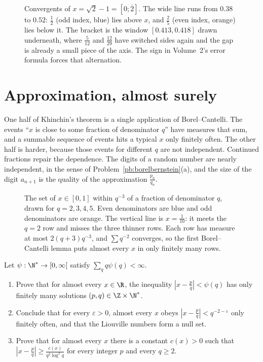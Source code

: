 \begin{figure}[ht]
\centering
{}
\caption{Convergents of $x=\sqrt2-1=[0;\overline{2}]$. The wide line runs from $0.38$ to $0.52$: $\frac12$ (odd index, blue) lies above $x$, and $\frac25$ (even index, orange) lies below it. The bracket is the window $[0.413,0.418]$ drawn underneath, where $\frac{5}{12}$ and $\frac{12}{29}$ have switched sides again and the gap is already a small piece of the axis. The sign in Volume~2's error formula forces that alternation.}\label{fig:c13approx}
\end{figure}

\section{Approximation, almost surely}

One half of Khinchin's theorem is a single application of Borel--Cantelli. The events ``$x$ is close to some fraction of denominator $q$'' have measures that sum, and a summable sequence of events hits a typical $x$ only finitely often. The other half is harder, because those events for different $q$ are not independent. Continued fractions repair the dependence. The digits of a random number are nearly independent, in the sense of Problem~\ref{pb:borelbernstein}(a), and the size of the digit $a_{n+1}$ is the quality of the approximation $\frac{p_n}{q_n}$.

\begin{figure}[ht]
\centering
{}
\caption{The set of $x\in[0,1]$ within $q^{-3}$ of a fraction of denominator $q$, drawn for $q=2,3,4,5$. Even denominators are blue and odd denominators are orange. The vertical line is $x=\frac1{10}$: it meets the $q=2$ row and misses the three thinner rows. Each row has measure at most $2(q+3)q^{-3}$, and $\sum q^{-2}$ converges, so the first Borel--Cantelli lemma puts almost every $x$ in only finitely many rows.}\label{fig:c13borel}
\end{figure}

\begin{exercise}[$\star$]\label{pb:khinconv}
Let $\psi:\N^*\to[0,\infty[$ satisfy $\sum_qq\psi(q)<\infty$.
\begin{enumerate}[label=(\alph*)]
\item Prove that for almost every $x\in\R$, the inequality $|x-\frac pq|<\psi(q)$ has only finitely many solutions $(p,q)\in\Z\times\N^*$.
\item Conclude that for every $\varepsilon>0$, almost every $x$ obeys $|x-\frac pq|<q^{-2-\varepsilon}$ only finitely often, and that the Liouville numbers form a null set.
\item Prove that for almost every $x$ there is a constant $c(x)>0$ such that $|x-\frac pq|\ge\frac{c(x)}{q^2\log^2q}$ for every integer $p$ and every $q\ge2$.
\end{enumerate}
\end{exercise}

